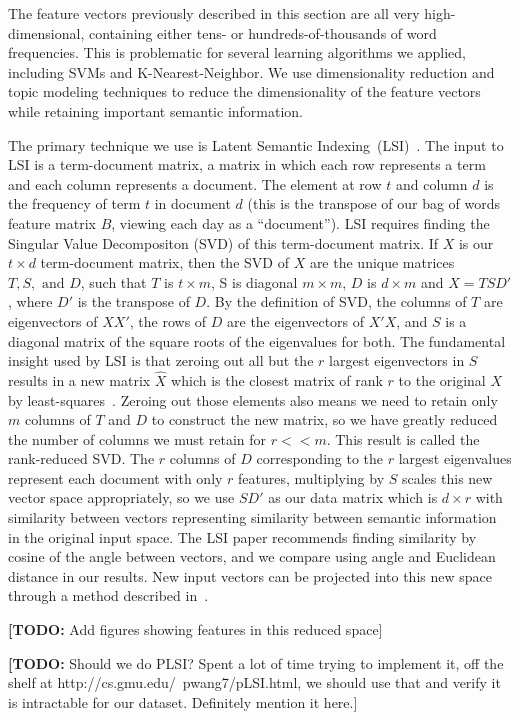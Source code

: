 \documentclass[10pt]{article}
\def\TODO#1{\noindent\textbf{[TODO:} #1]}
\begin{document}
The feature vectors previously described in this section are all very high-dimensional, containing either tens- or hundreds-of-thousands of word frequencies. This is problematic for several learning algorithms we applied, including SVMs and K-Nearest-Neighbor. We use dimensionality reduction and topic modeling techniques to reduce the dimensionality of the feature vectors while retaining important semantic information.

The primary technique we use is Latent Semantic Indexing~(LSI)~\cite{lsi}. The input to LSI is a term-document matrix, a matrix in which each row represents a term and each column represents a document. The element at row $t$ and column $d$ is the frequency of term $t$ in document $d$ (this is the transpose of our bag of words feature matrix $B$, viewing each day as a ``document''). LSI requires finding the Singular Value Decompositon (SVD) of this term-document matrix. If $X$ is our $t \times d$ term-document matrix, then the SVD of $X$ are the unique matrices $T, S, \text{ and } D$, such that $T$ is $t \times m$, S is diagonal $m \times m$, $D$ is $d \times m$ and $X = T S D'$, where $D'$ is the transpose of $D$. By the definition of SVD, the columns of $T$ are eigenvectors of $X X'$, the rows of $D$ are the eigenvectors of $X' X$, and $S$ is a diagonal matrix of the square roots of the eigenvalues for both. The fundamental insight used by LSI is that zeroing out all but the $r$ largest eigenvectors in $S$ results in a new matrix $\hat{X}$ which is the closest matrix of rank $r$ to the original $X$ by least-squares~\cite{lsi}. Zeroing out those elements also means we need to retain only $m$ columns of $T$ and $D$ to construct the new matrix, so we have greatly reduced the number of columns we must retain for $r << m$. This result is called the rank-reduced SVD. The $r$ columns of $D$ corresponding to the $r$ largest eigenvalues represent each document with only $r$ features, multiplying by $S$ scales this new vector space appropriately, so we use $S D'$ as our data matrix which is $d \times r$ with similarity between vectors representing similarity between semantic information in the original input space. The LSI paper recommends finding similarity by cosine of the angle between vectors, and we compare using angle and Euclidean distance in our results. New input vectors can be projected into this new space through a method described in~\cite{lsi}.

\TODO{Add figures showing features in this reduced space}

\TODO{Should we do PLSI? Spent a lot of time trying to implement it, off the shelf at http://cs.gmu.edu/~pwang7/pLSI.html, we should use that and verify it is intractable for our dataset. Definitely mention it here.} 
\end{document}
